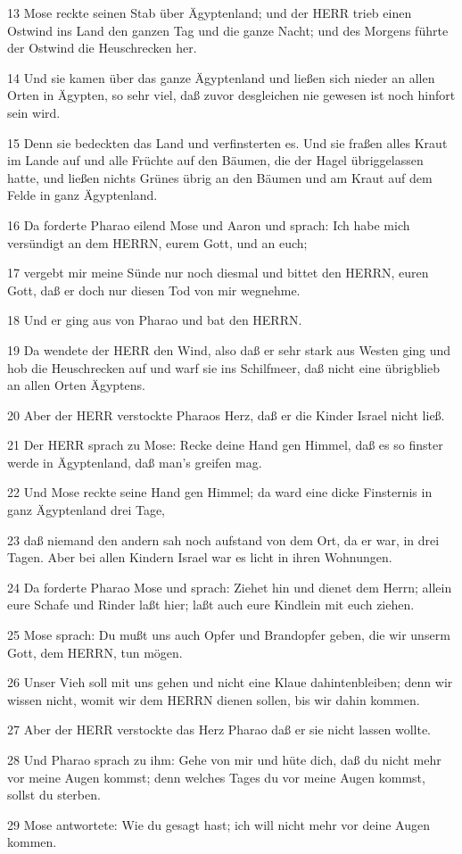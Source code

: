 \par 13 Mose reckte seinen Stab über Ägyptenland; und der HERR trieb einen Ostwind ins Land den ganzen Tag und die ganze Nacht; und des Morgens führte der Ostwind die Heuschrecken her.
\par 14 Und sie kamen über das ganze Ägyptenland und ließen sich nieder an allen Orten in Ägypten, so sehr viel, daß zuvor desgleichen nie gewesen ist noch hinfort sein wird.
\par 15 Denn sie bedeckten das Land und verfinsterten es. Und sie fraßen alles Kraut im Lande auf und alle Früchte auf den Bäumen, die der Hagel übriggelassen hatte, und ließen nichts Grünes übrig an den Bäumen und am Kraut auf dem Felde in ganz Ägyptenland.
\par 16 Da forderte Pharao eilend Mose und Aaron und sprach: Ich habe mich versündigt an dem HERRN, eurem Gott, und an euch;
\par 17 vergebt mir meine Sünde nur noch diesmal und bittet den HERRN, euren Gott, daß er doch nur diesen Tod von mir wegnehme.
\par 18 Und er ging aus von Pharao und bat den HERRN.
\par 19 Da wendete der HERR den Wind, also daß er sehr stark aus Westen ging und hob die Heuschrecken auf und warf sie ins Schilfmeer, daß nicht eine übrigblieb an allen Orten Ägyptens.
\par 20 Aber der HERR verstockte Pharaos Herz, daß er die Kinder Israel nicht ließ.
\par 21 Der HERR sprach zu Mose: Recke deine Hand gen Himmel, daß es so finster werde in Ägyptenland, daß man's greifen mag.
\par 22 Und Mose reckte seine Hand gen Himmel; da ward eine dicke Finsternis in ganz Ägyptenland drei Tage,
\par 23 daß niemand den andern sah noch aufstand von dem Ort, da er war, in drei Tagen. Aber bei allen Kindern Israel war es licht in ihren Wohnungen.
\par 24 Da forderte Pharao Mose und sprach: Ziehet hin und dienet dem Herrn; allein eure Schafe und Rinder laßt hier; laßt auch eure Kindlein mit euch ziehen.
\par 25 Mose sprach: Du mußt uns auch Opfer und Brandopfer geben, die wir unserm Gott, dem HERRN, tun mögen.
\par 26 Unser Vieh soll mit uns gehen und nicht eine Klaue dahintenbleiben; denn wir wissen nicht, womit wir dem HERRN dienen sollen, bis wir dahin kommen.
\par 27 Aber der HERR verstockte das Herz Pharao daß er sie nicht lassen wollte.
\par 28 Und Pharao sprach zu ihm: Gehe von mir und hüte dich, daß du nicht mehr vor meine Augen kommst; denn welches Tages du vor meine Augen kommst, sollst du sterben.
\par 29 Mose antwortete: Wie du gesagt hast; ich will nicht mehr vor deine Augen kommen.

